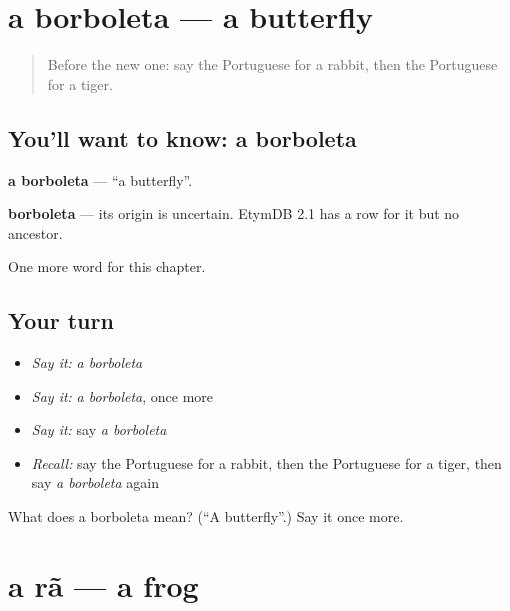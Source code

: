 \section[a borboleta]{a borboleta — a butterfly}

\label{lesson:PT-C118-borboleta}



\begin{quote}
Before the new one: say the Portuguese for a rabbit, then the Portuguese for a tiger.
\end{quote}

\subsection*{You'll want to know: a borboleta}
\textbf{a borboleta} — \textquotedblleft{}a butterfly\textquotedblright{}.

\begin{cousinweb}
\textbf{borboleta} — its origin is uncertain. EtymDB 2.1 has a row for it but no ancestor.
\end{cousinweb}

\begin{grammarlens}[title={What you've built}]
One more word for this chapter.
\end{grammarlens}

\subsection*{Your turn}
\begin{itemize}
\raggedright
  \item \emph{Say it:} \emph{a borboleta}
  \item \emph{Say it:} \emph{a borboleta}, once more
  \item \emph{Say it:} say \emph{a borboleta}
  \item \emph{Recall:} say the Portuguese for a rabbit, then the Portuguese for a tiger, then say \emph{a borboleta} again
\end{itemize}

\begin{tcolorbox}[breakable,colback=teal!4,colframe=teal!35!black,title={Before you move on}]
What does a borboleta mean? (\textquotedblleft{}A butterfly\textquotedblright{}.) Say it once more.
\end{tcolorbox}
\section[a rã]{a rã — a frog}

